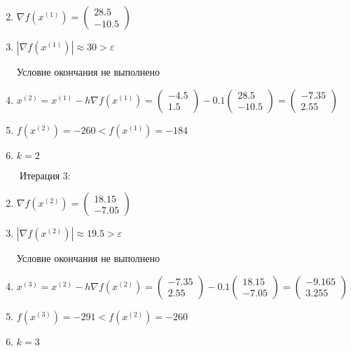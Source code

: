 \documentclass{article}
\begin{document}
\begin{enumerate}
    \setcounter{enumi}{1}
    \item $\nabla f(x^{(1)}) = \begin{pmatrix} 28.5 \\ -10.5 \end{pmatrix}$
    \item $|\nabla f(x^{(1)})| \approx 30 > \varepsilon$
    
        Условие окончания не выполнено
    \item $x^{(2)} = x^{(1)} - h\nabla f(x^{(1)}) =
        \begin{pmatrix} -4.5 \\ 1.5 \end{pmatrix} - 0.1
        \begin{pmatrix} 28.5 \\ -10.5 \end{pmatrix} =
        \begin{pmatrix} -7.35 \\ 2.55 \end{pmatrix}$
    \item $f(x^{(2)}) = -260 < f(x^{(1)}) = -184$
    \item $k = 2$
\end{enumerate}

\ \ \ \ Итерация 3:

\begin{enumerate}
    \setcounter{enumi}{1}
    \item $\nabla f(x^{(2)}) = \begin{pmatrix} 18.15 \\ -7.05 \end{pmatrix}$
    \item $|\nabla f(x^{(2)})| \approx 19.5 > \varepsilon$
    
        Условие окончания не выполнено
    \item $x^{(3)} = x^{(2)} - h\nabla f(x^{(2)}) =
        \begin{pmatrix} -7.35 \\ 2.55 \end{pmatrix} - 0.1
        \begin{pmatrix} 18.15 \\ -7.05 \end{pmatrix} =
        \begin{pmatrix} -9.165 \\ 3.255 \end{pmatrix}$
    \item $f(x^{(3)}) = -291 < f(x^{(2)}) = -260$
    \item $k = 3$
\end{enumerate}
\end{document}
